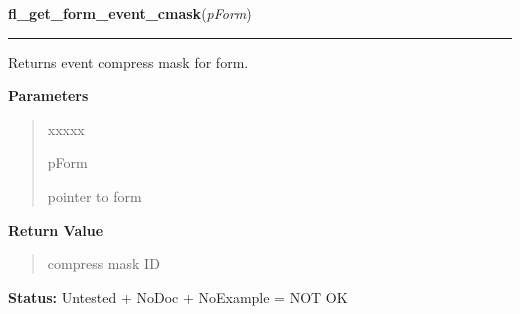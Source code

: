 \hspace{.8\funcindent}\begin{boxedminipage}{\funcwidth}

    \raggedright \textbf{fl\_get\_form\_event\_cmask}(\textit{pForm})

    \vspace{-1.5ex}

    \rule{\textwidth}{0.5\fboxrule}
\setlength{\parskip}{2ex}
    Returns event compress mask for form.

\setlength{\parskip}{1ex}
      \textbf{Parameters}
      \vspace{-1ex}

      \begin{quote}
        \begin{Ventry}{xxxxx}

          \item[pForm]

          pointer to form

        \end{Ventry}

      \end{quote}

      \textbf{Return Value}
    \vspace{-1ex}

      \begin{quote}
      compress mask ID

      \end{quote}

\textbf{Status:} Untested + NoDoc + NoExample = NOT OK



    \end{boxedminipage}

    \label{xformslib:library:fl_set_form_geometry}

    \vspace{0.5ex}

